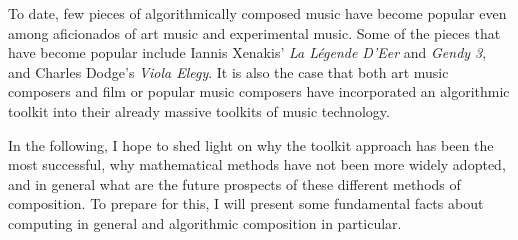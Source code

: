 \documentclass[11pt]{amsart}
\begin{document}
To date, few pieces of algorithmically composed music have become popular even among aficionados of art music and experimental music. Some of the pieces that have become popular include Iannis Xenakis' \emph{La Légende D'Eer} and \emph{Gendy 3}, and Charles Dodge's \emph{Viola Elegy}. It is also the case that both art music composers and film or popular music composers have incorporated an algorithmic toolkit into their already massive toolkits of music technology.

In the following, I hope to shed light on why the toolkit approach has been the most successful, why mathematical methods have not been more widely adopted, and in general what are the future prospects of these different methods of composition. To prepare for this, I will present some fundamental facts about computing in general and algorithmic composition in particular.






\end{document}
